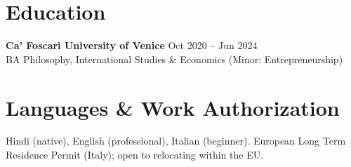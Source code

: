 \documentclass[a4paper,10pt]{article}
\begin{document}
\section{Education}
\textbf{Ca' Foscari University of Venice} \hfill Oct 2020 -- Jun 2024\\
BA Philosophy, International Studies \& Economics (Minor: Entrepreneurship)

\section{Languages \& Work Authorization}
Hindi (native), English (professional), Italian (beginner). European Long Term Residence Permit (Italy); open to relocating within the EU.
\end{document}
